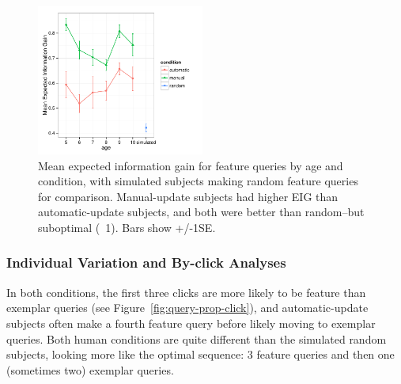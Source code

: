 \documentclass[10pt,letterpaper]{article}
\begin{document}
\begin{figure}[t]
  \centering
  \includegraphics[width=0.49\textwidth]{figures/EIG_by_age_n_condition}
  \caption{Mean expected information gain for feature queries by age and condition, with simulated subjects making random feature queries for comparison. Manual-update subjects had higher EIG than automatic-update subjects, and both were better than random--but suboptimal (~1). Bars show +/-1SE.}
  \label{fig:EIG_by_age}
\end{figure} 

\subsubsection{Individual Variation and By-click Analyses}



In both conditions, the first three clicks are more likely to be feature than exemplar queries (see Figure~\ref{fig:query-prop-click}), and automatic-update subjects often make a fourth feature query before likely moving to exemplar queries. Both human conditions are quite different than the simulated random subjects, looking more like the optimal sequence: 3 feature queries and then one (sometimes two) exemplar queries. 
\end{document}
